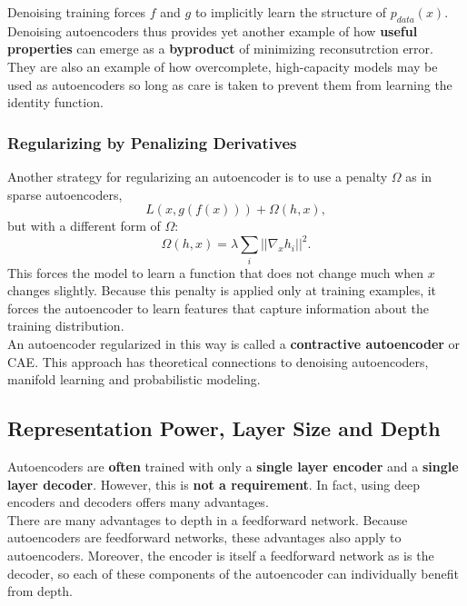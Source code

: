 \documentclass[11pt]{article}
\begin{document}
Denoising training forces \(f\) and \(g\) to implicitly learn the structure of \(p_{data}(x)\). Denoising autoencoders thus provides yet another example of how \textbf{useful properties} can emerge as a \textbf{byproduct} of minimizing reconsutrction error. They are also an example of how overcomplete, high-capacity models may be used as autoencoders so long as care is taken to prevent them from learning the identity function.\\


\subsubsection{Regularizing by Penalizing Derivatives}
\label{sec:org7d98ca5}
Another strategy for regularizing an autoencoder is to use a penalty \(\Omega\) as in sparse autoencoders,\\
\begin{equation}
L(x,g(f(x))) + \Omega(h,x),
\end{equation}
but with a different form of \(\Omega\):\\
\begin{equation}
\Omega(h,x) = \lambda \sum_i ||\nabla_x h_i||^2.
\end{equation}
This forces the model to learn a function that does not change much when \(x\) changes slightly. Because this penalty is applied only at training examples, it forces the autoencoder to learn features that capture information about the training distribution.\\


An autoencoder regularized in this way is called a \textbf{contractive autoencoder} or CAE. This approach has theoretical connections to denoising autoencoders, manifold learning and probabilistic modeling.\\


\subsection{Representation Power, Layer Size and Depth}
\label{sec:org5ab1de7}
Autoencoders are \textbf{often} trained with only a \textbf{single layer encoder} and a \textbf{single layer decoder}. However, this is \textbf{not a requirement}. In fact, using deep encoders and decoders offers many advantages.\\


There are many advantages to depth in a feedforward network. Because autoencoders are feedforward networks, these advantages also apply to autoencoders. Moreover, the encoder is itself a feedforward network as is the decoder, so each of these components of the autoencoder can individually benefit from depth.\\
\end{document}
